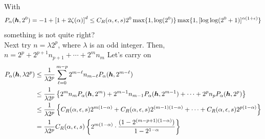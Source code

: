 \documentclass{amsart}
\newcommand{\FredNote}[1]{{\color{blue}#1}}
\newcommand{\LarysaNote}[1]{{\color{violet}#1}}
\begin{document}
With \[P_\alpha(\vh,2^0) = -1 + \left[1 + 2 \zeta(\alpha) \right]^d
      \le C_{R}(\alpha,\epsilon,s) 2^0 \max \{1, \log(2^{0})\} \max \{1,[\log \log (2^0+1)]^{\alpha(1+\epsilon)} \} %
\] \LarysaNote{something is not quite right?} \\ 

Next try $n = \lambda 2^p$, where $\lambda$ is an odd integer. Then, $n = 2^p + 2^{p+1}n_{p+1} + \cdots + 2^m n_m$
\FredNote{Let's carry on} \\

\begin{align*}
    P_\alpha(\vh,\lambda 2^p) 
    & \le \frac {1}{\lambda 2^p} \sum_{\ell = 0}^{m-p} 2^{m-\ell} n_{m -\ell} P_\alpha(\vh,2^{m-\ell}) \\
    & \le \frac {1}{\lambda 2^p} \left\{2^m n_m P_\alpha(\vh,2^m) + 2^{m-1} n_{m-1} P_\alpha(\vh,2^{m-1}) + \cdots + 2^p n_p P_\alpha(\vh,2^p) %
    \right\} \\ %
    & \le \frac {1}{\lambda 2^p} \left\{C_{R}(\alpha,\epsilon,s) 2^{m(1-\alpha)} + C_{R}(\alpha,\epsilon,s) 2^{(m-1)(1-\alpha)} + \cdots +  C_{R}(\alpha,\epsilon,s) 2^{p(1-\alpha)}\right\} \\
    & = \frac {1}{\lambda 2^p} C_{R}(\alpha,\epsilon,s) \left\{ 2^{m(1-\alpha)} \cdot \frac{(1 - 2^{(m-p+1)(1-\alpha)})}{1 - 2^{1-\alpha}}\right\} 
\end{align*}




\end{document}
